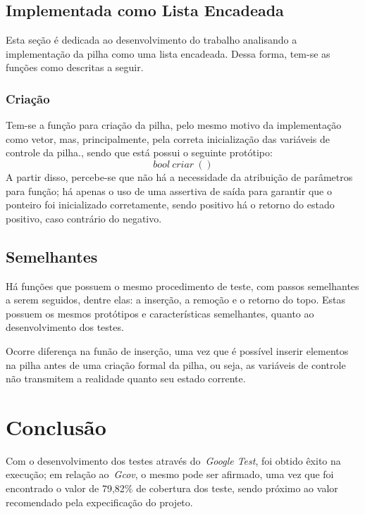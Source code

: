 \documentclass[conference]{Trabalho_1}
\begin{document}
\subsection{Implementada como Lista Encadeada}
Esta se\c{c}\~ao \'e dedicada ao desenvolvimento do trabalho analisando a implementa\c{c}\~ao da pilha como uma lista encadeada. Dessa forma, tem-se as fun\c{c}\~oes como descritas a seguir.

\subsubsection{Cria\c{c}\~ao}
Tem-se a fun\c{c}\~ao para cria\c{c}\~ao da pilha, pelo mesmo motivo da implementa\c{c}\~ao como vetor, mas, principalmente, pela correta inicializa\c{c}\~ao das vari\'aveis de controle da pilha., sendo que est\'a possui o seguinte prot\'otipo:
$$bool\ criar\ ()$$
A partir disso, percebe-se que n\~ao h\'a a necessidade da atribui\c{c}\~ao de par\^ametros para fun\c{c}\~ao; h\'a apenas o uso de uma assertiva de sa\'ida para garantir que o ponteiro foi inicializado corretamente, sendo positivo h\'a o retorno do estado positivo, caso contr\'ario do negativo.


\subsection{Semelhantes}
H\'a fun\c{c}\~oes que possuem o mesmo procedimento de teste, com passos semelhantes a serem seguidos, dentre elas: a inser\c{c}\~ao, a remo\c{c}\~ao e o retorno do topo. Estas possuem os mesmos prot\'otipos e caracter\'isticas semelhantes, quanto ao desenvolvimento dos testes.

Ocorre diferen\c{c}a na fun\~ao de inser\c{c}\~ao, uma vez que \'e poss\'ivel inserir elementos na pilha antes de uma cria\c{c}\~ao formal da pilha, ou seja, as vari\'aveis de controle n\~ao transmitem a realidade quanto seu  estado corrente.

\section{Conclus\~ao}
Com o desenvolvimento dos testes atrav\'es do~\textit{Google Test}, foi obtido \^exito na execu\c{c}\~ao; em rela\c{c}\~ao ao~\textit{Gcov}, o mesmo pode ser afirmado, uma vez que foi encontrado o valor de 79,82\% de cobertura dos teste, sendo pr\'oximo ao valor recomendado pela expecifica\c{c}\~ao do projeto.
\end{document}
